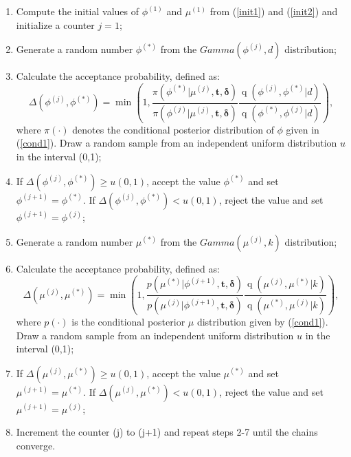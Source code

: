 \documentclass[12pt]{article} %
\newcommand{\f}{\operatorname}
\theoremstyle{plain}%
\theoremstyle{definition}
\theoremstyle{remark}
\begin{document}
\begin{enumerate}
\item Compute the initial values of $\phi^{(1)}$ and $\mu^{(1)}$ from (\ref{init1}) and (\ref{init2}) and initialize a counter $j=1$;
\item Generate a random number $\phi^{(*)}$ from the $Gamma(\phi^{(j)}, d)$ distribution;
\item Calculate the acceptance probability, defined as:
\begin{equation*}
\Delta\left(\phi^{(j)},\phi^{(*)}\right)=\min\left(1, \frac{\pi\left(\phi^{(*)}|\mu^{(j)},\boldsymbol{t,\delta}\right)}{\pi\left(\phi^{(j)}|\mu^{(j)},\boldsymbol{t,\delta}\right)} \frac{\f{q}\left(\phi^{(j)},\phi^{(*)}|d\right)}{\f{q}\left(\phi^{(*)},\phi^{(j)}|d\right)}\right),
\end{equation*}
where $\pi(\cdot)$ denotes the conditional posterior distribution of $\phi$ given in (\ref{cond1}). Draw a random sample from an independent uniform distribution $u$ in the interval (0,1);
\item If $\Delta\left(\phi^{(j)},\phi^{(*)}\right)\geq u(0,1)$, accept the value $\phi^{(*)}$ and set $\phi^{(j+1)}=\phi^{(*)}$. If $\Delta\left(\phi^{(j)},\phi^{(*)}\right)< u(0,1)$, reject the value and set $\phi^{(j+1)}=\phi^{(j)}$;

\item Generate a random number $\mu^{(*)}$ from the $Gamma(\mu^{(j)}, k)$ distribution;
\item Calculate the acceptance probability, defined as:
\begin{equation*}
\Delta\left(\mu^{(j)},\mu^{(*)}\right)=\min\left(1, \frac{p\left(\mu^{(*)}|\phi^{(j+1)},\boldsymbol{t,\delta}\right)}{p\left(\mu^{(j)}|\phi^{(j+1)},\boldsymbol{t,\delta}\right)} \frac{\f{q}\left(\mu^{(j)},\mu^{(*)}|k\right)}{\f{q}\left(\mu^{(*)},\mu^{(j)}|k\right)}\right),
\end{equation*}
where $p(\cdot)$ is the conditional posterior $\mu$ distribution given by (\ref{cond1}). Draw a random sample from an independent uniform distribution $u$ in the interval (0,1);
\item If $\Delta\left(\mu^{(j)},\mu^{(*)}\right)\geq u(0,1)$, accept the value $\mu^{(*)}$ and set $\mu^{(j+1)}=\mu^{(*)}$. If $\Delta\left(\mu^{(j)},\mu^{(*)}\right)< u(0,1)$, reject the value and set $\mu^{(j+1)}=\mu^{(j)}$;

\item Increment the counter (j) to (j+1) and repeat steps 2-7 until the chains converge.
\end{enumerate}
\end{document}

